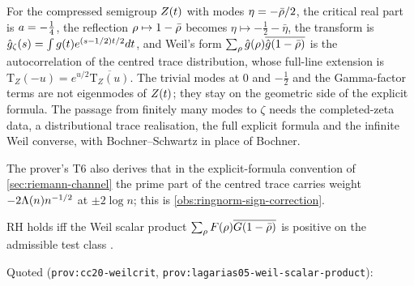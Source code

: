 \begin{observation}
\label{obs:weil-zeta-dictionary}
For the compressed semigroup $Z(t)$ with modes $\eta = -\bar{\rho}/2$, the critical real
part is $a = -\frac14$, the reflection $\rho\mapsto1-\bar{\rho}$ becomes
$\eta\mapsto-\frac12-\bar\eta$, the transform is $\hat g_\zeta(s) = \int g(t)
e^{(s-1/2)t/2}dt$, and Weil's form $\sum_\rho\hat g(\rho)\overline{\hat g(1-\bar{\rho})}$
is the autocorrelation of the centred trace distribution, whose full-line extension is
$\mathrm{T}_Z(-u) = e^{u/2}\overline{\mathrm{T}_Z(u)}$. The trivial modes at $0$ and $-\frac12$ and the
Gamma-factor terms are not eigenmodes of $Z(t)$; they stay on the geometric side of the
explicit formula. The passage from finitely many modes to $\zeta$ needs the completed-zeta
data, a distributional trace realisation, the full explicit formula and the infinite Weil
converse, with Bochner--Schwartz in place of Bochner.
\end{observation}

The prover's T6 also derives that in the explicit-formula convention of
\cref{sec:riemann-channel} the prime part of the centred trace carries weight
$-2\Lambda(n)n^{-1/2}$ at $\pm2\log n$; this is \cref{obs:ringnorm-sign-correction}.

\begin{citedfact}
\label{cit:weil-criterion}
RH holds iff the Weil scalar product $\sum_\rho F(\rho)\overline{G(1-\bar{\rho})}$ is
positive on the admissible test class \cite{connesconsani2020weil,lagarias2005li}.

\par\noindent Quoted (\texttt{prov:cc20-weilcrit}, \texttt{prov:lagarias05-weil-scalar-product}):
{\small\texttt{}}

{\small\texttt{}}
\end{citedfact}

